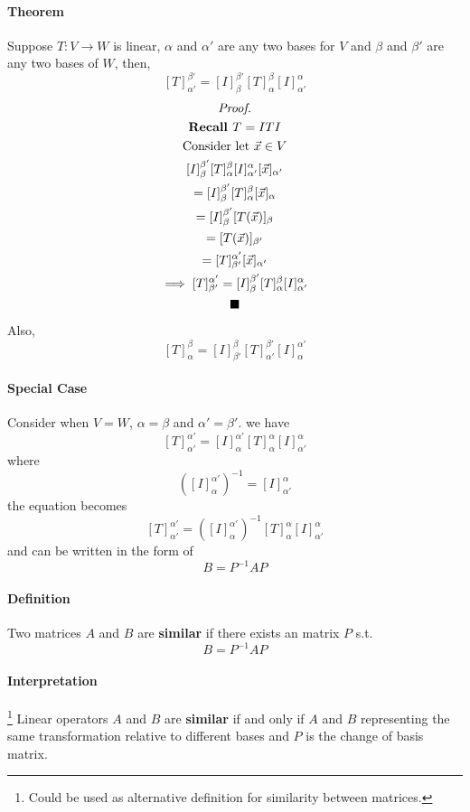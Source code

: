 \documentclass[11pt]{article}
\newcommand{\trans}[3]{{#1}: {#2} \to {#3}}
\newcommand{\coor}[2]{[\vec{{#1}}]_{{#2}}}
\newcommand{\tmat}[3]{[{#1}]_{{#2}}^{{#3}}}
\newcommand{\definition}[0]{\paragraph{Definition}}
\newcommand{\theorem}[0]{\paragraph{Theorem}}
\begin{document}
	\theorem Suppose $\trans{T}{V}{W}$ is linear, $\alpha$ and $\alpha'$ are any two bases for $V$ and $\beta$ and $\beta'$ are any two bases of $W$, then,
	\[
		\tmat{T}{\alpha'}{\beta'} = \tmat{I}{\beta}{\beta'}\tmat{T}{\alpha}{\beta}\tmat{I}{\alpha'}{\alpha}
	\]
	\begin{multline*}
		\emph{Proof.} \\
		\textbf{Recall } T=ITI \\
		\text{Consider let } \vec{x} \in V \\
		\tmat{I}{\beta}{\beta'}\tmat{T}{\alpha}{\beta}\tmat{I}{\alpha'}{\alpha}\coor{x}{\alpha'} \\
		= \tmat{I}{\beta}{\beta'}\tmat{T}{\alpha}{\beta}\coor{x}{\alpha} \\
		= \tmat{I}{\beta}{\beta'}[T(\vec{x})]_\beta \\
		= [T(\vec{x})]_{\beta'} \\
		= \tmat{T}{\beta'}{\alpha'}\coor{x}{\alpha'} \\
		\implies \tmat{T}{\beta'}{\alpha'} = \tmat{I}{\beta}{\beta'}\tmat{T}{\alpha}{\beta}\tmat{I}{\alpha'}{\alpha} \\
		\blacksquare
	\end{multline*}
	Also,
	\[
		\tmat{T}{\alpha}{\beta} = \tmat{I}{\beta'}{\beta}\tmat{T}{\alpha'}{\beta'}\tmat{I}{\alpha}{\alpha'}
	\]
	\paragraph{Special Case} Consider when $V = W$, $\alpha = \beta$ and $\alpha' = \beta'$. we have
	\[
		\tmat{T}{\alpha'}{\alpha'} = \tmat{I}{\alpha}{\alpha'}
		\tmat{T}{\alpha}{\alpha} \tmat{I}{\alpha'}{\alpha} 
	\] where
	\[
	(\tmat{I}{\alpha}{\alpha'})^{-1} = \tmat{I}{\alpha'}{\alpha}
	\] the equation becomes
	\[
		\tmat{T}{\alpha'}{\alpha'} = (\tmat{I}{\alpha}{\alpha'})^{-1}
		\tmat{T}{\alpha}{\alpha} \tmat{I}{\alpha'}{\alpha} 
	\] and can be written in the form of 
	\[
		B = P^{-1}AP
	\]
	\definition Two matrices $A$ and $B$ are \textbf{similar} if there exists an  matrix $P$ s.t.
	\[
		B = P^{-1}AP
	\]
	\paragraph{Interpretation}\footnote{Could be used as alternative definition for similarity between matrices.} Linear operators $A$ and $B$ are \textbf{similar} if and only if $A$ and $B$ representing the same transformation relative to different bases and $P$ is the change of basis matrix.
\end{document}
